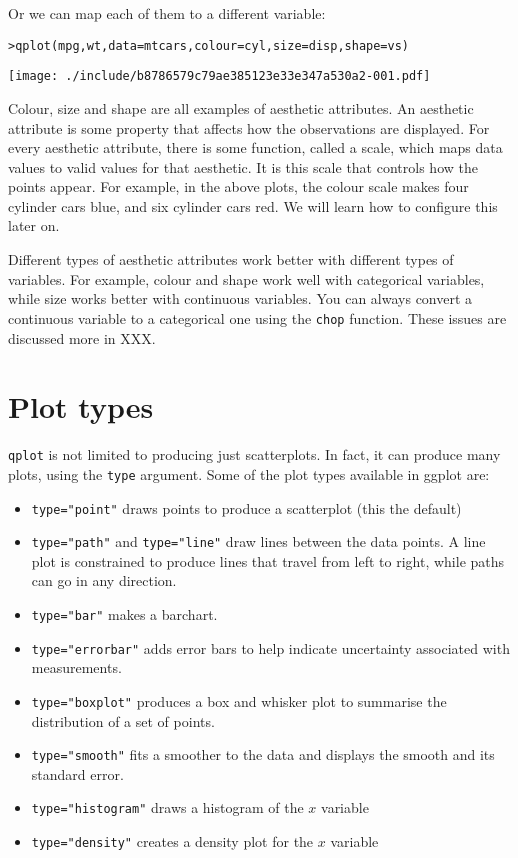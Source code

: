 Or we can map each of them to a different variable:

\begin{alltt}
> qplot(mpg, wt, data = mtcars, colour = cyl, size = disp, shape = vs)
\end{alltt}
\texttt{[image: ./include/b8786579c79ae385123e33e347a530a2-001.pdf]}
\begin{alltt}

\end{alltt}%

Colour, size and shape are all examples of aesthetic attributes.  An aesthetic attribute is some property that affects how the observations are displayed.  For every aesthetic attribute, there is some function, called a scale, which maps data values to valid values for that aesthetic.  It is this scale that controls how the points appear.  For example, in the above plots, the colour scale makes four cylinder cars blue, and six cylinder cars red.  We will learn how to configure this later on.

Different types of aesthetic attributes work better with different types of variables.  For example, colour and shape work well with categorical variables, while size works better with continuous variables.  You can always convert a continuous variable to a categorical one using the {\tt chop} function.  These issues are discussed more in XXX.

\section{Plot types}\label{sec:plot_types}

{\tt qplot} is not limited to producing just scatterplots.  In fact, it can produce many plots, using the {\tt type} argument.  Some of the plot types available in ggplot are:

\begin{itemize}
	\item {\tt type="point"} draws points to produce a scatterplot (this the default)
	\item {\tt type="path"} and {\tt type="line"} draw lines between the data points.  A line plot is constrained to produce lines that travel from left to right, while paths can go in any direction.
	\item {\tt type="bar"} makes a barchart.
	\item {\tt type="errorbar"} adds error bars to help indicate uncertainty associated with measurements.
	\item {\tt type="boxplot"} produces a box and whisker plot to summarise the distribution of a set of points.
	\item {\tt type="smooth"} fits a smoother to the data and displays the smooth and its standard error.
	\item {\tt type="histogram"} draws a histogram of the $x$ variable
	\item {\tt type="density"} creates a density plot for the $x$ variable
\end{itemize}

